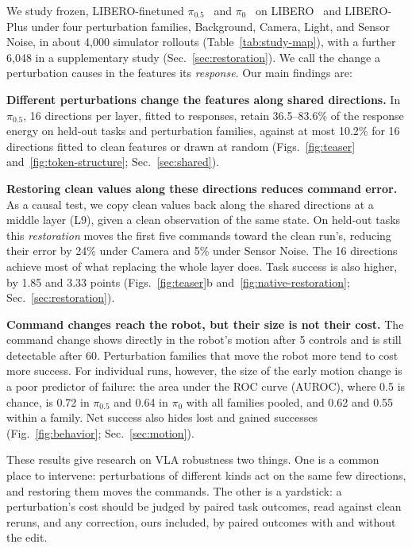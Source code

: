 We study frozen, LIBERO-finetuned $\pi_{0.5}$~\cite{pi05} and $\pi_0$~\cite{pi0} on LIBERO~\cite{libero} and LIBERO-Plus under four perturbation families, Background, Camera, Light, and Sensor Noise, in about 4,000 simulator rollouts (Table~\ref{tab:study-map}), with a further 6,048 in a supplementary study (Sec.~\ref{sec:restoration}). We call the change a perturbation causes in the features its \emph{response}. Our main findings are:

\textbf{Different perturbations change the features along shared directions.} In $\pi_{0.5}$, 16 directions per layer, fitted to responses, retain 36.5--83.6\% of the response energy on held-out tasks and perturbation families, against at most 10.2\% for 16 directions fitted to clean features or drawn at random (Figs.~\ref{fig:teaser} and~\ref{fig:token-structure}; Sec.~\ref{sec:shared}).

\textbf{Restoring clean values along these directions reduces command error.} As a causal test, we copy clean values back along the shared directions at a middle layer (L9), given a clean observation of the same state. On held-out tasks this \emph{restoration} moves the first five commands toward the clean run's, reducing their error by 24\% under Camera and 5\% under Sensor Noise. The 16 directions achieve most of what replacing the whole layer does. Task success is also higher, by 1.85 and 3.33 points (Figs.~\ref{fig:teaser}b and~\ref{fig:native-restoration}; Sec.~\ref{sec:restoration}).

\textbf{Command changes reach the robot, but their size is not their cost.} The command change shows directly in the robot's motion after 5 controls and is still detectable after 60. Perturbation families that move the robot more tend to cost more success. For individual runs, however, the size of the early motion change is a poor predictor of failure: the area under the ROC curve (AUROC), where 0.5 is chance, is 0.72 in $\pi_{0.5}$ and 0.64 in $\pi_0$ with all families pooled, and 0.62 and 0.55 within a family. Net success also hides lost and gained successes (Fig.~\ref{fig:behavior}; Sec.~\ref{sec:motion}).

These results give research on VLA robustness two things. One is a common place to intervene: perturbations of different kinds act on the same few directions, and restoring them moves the commands. The other is a yardstick: a perturbation's cost should be judged by paired task outcomes, read against clean reruns, and any correction, ours included, by paired outcomes with and without the edit.
